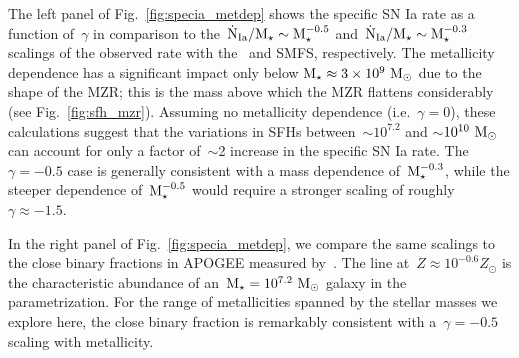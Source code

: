 \documentclass[ms.tex]{subfiles}
\begin{document}
The left panel of Fig.~\ref{fig:specia_metdep} shows the specific SN Ia rate
as a function of~$\gamma$ in comparison to the~$\dot{\text{N}}_\text{Ia} /
\text{M}_\star \sim \text{M}_\star^{-0.5}$ and~$\dot{\text{N}}_\text{Ia} / \text{M}_\star \sim
\text{M}_\star^{-0.3}$ scalings of the observed rate with the~\citet{Bell2003} and
\citet{Baldry2012} SMFS, respectively.
The metallicity dependence has a significant impact only below
$\text{M}_\star \approx 3\times10^9~\text{M}_\odot$ due to the shape of the MZR;
this is the mass above which the MZR flattens considerably (see
Fig.~\ref{fig:sfh_mzr}).
Assuming no metallicity dependence (i.e.~$\gamma = 0$), these calculations
suggest that the variations in SFHs between~$\sim$$10^{7.2}$ and
$\sim$$10^{10}~\text{M}_\odot$ can account for only a factor of~$\sim$2 increase in the
specific SN Ia rate.
The~$\gamma = -0.5$ case is generally consistent with a mass dependence
of~$\text{M}_\star^{-0.3}$, while the steeper dependence of~$\text{M}_\star^{-0.5}$ would
require a stronger scaling of roughly~$\gamma \approx -1.5$.
\par
In the right panel of Fig.~\ref{fig:specia_metdep}, we compare the same
scalings to the close binary fractions in APOGEE measured by~\citet{Moe2019}.
The line at~$Z \approx 10^{-0.6} Z_\odot$ is the characteristic abundance of
an~$\text{M}_\star = 10^{7.2}~\text{M}_\odot$ galaxy in the~\citet{Zahid2014} parametrization.
For the range of metallicities spanned by the stellar masses we explore here,
the close binary fraction is remarkably consistent with a~$\gamma = -0.5$
scaling with metallicity.
\end{document}
